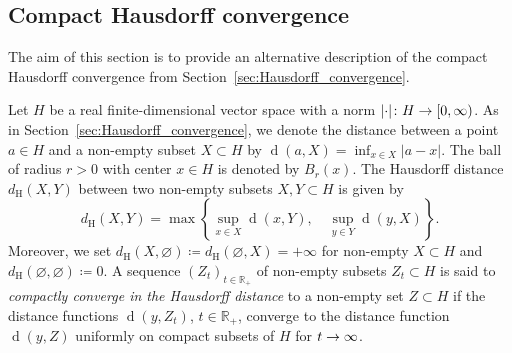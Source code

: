 \documentclass[AHL,Unicode,longabstracts]{cedram}
\newcommand{\refnorm}[1]{\lvert#1\rvert}
\DeclareMathOperator{\dist}{d}
\newcommand{\R}{\mathbb{R}}
\newcommand{\hdist}{d_{\mathrm{H}}}
\renewcommand*{\to}{\mathchoice{\longrightarrow}{\rightarrow}{\rightarrow}{\rightarrow}}
\begin{document}
\subsection{Compact Hausdorff convergence} \label{ss:CompactHausdorffConvergence}
The aim of this section is to provide an alternative description of the compact Hausdorff convergence from Section~\ref{sec:Hausdorff_convergence}.



Let $H$ be a real finite-dimensional vector space with a norm $\refnorm{\cdot} \colon H \to [0, \infty)$. As in Section~\ref{sec:Hausdorff_convergence}, we denote the distance between a point $a \in H$ and a non-empty subset $X \subset H$ by $\dist(a, X) = \inf_{x \in X} \refnorm{a-x}$. The ball of radius $r >0$ with center $x \in H$ is denoted by $B_r(x)$. The Hausdorff distance $\hdist(X, Y)$ between two non-empty subsets $X, Y \subset H$ is given by
\[
\hdist(X,Y) = \max\left\{ \sup_{x \in X} \dist(x,Y), \quad \sup_{y \in Y} \dist(y,X) \right\}.
\]
Moreover, we set $\hdist(X,\varnothing) \coloneqq \hdist(\varnothing, X) = +\infty$ for non-empty $X \subset H$ and\linebreak $\hdist(\varnothing,\varnothing) \coloneqq 0$. A sequence $(Z_t)_{t \in \R_+}$ of non-empty subsets $Z_t\subset H$ is said to \emph{compactly converge in the Hausdorff distance} to a non-empty set $Z \subset H$ if the distance functions $\dist(y, Z_t)$, $t \in \R_+$, converge to the distance function $\dist(y, Z)$ uniformly on compact subsets of $H$ for $t \to \infty$.
\end{document}
